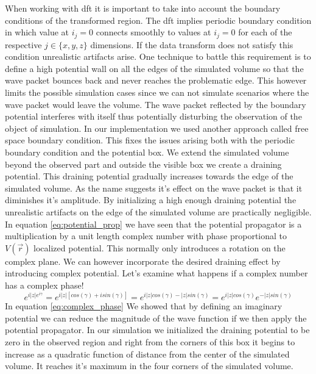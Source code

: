 When working with \acrshort{dft} it is important to take into account the boundary conditions of the transformed region.
The \acrshort{dft} implies periodic boundary condition in which value at $i_j = 0$ connects smoothly to values at $i_j = 0$ for each of the respective $j \in \{x, y, z\}$ dimensions.
If the data transform does not satisfy this condition unrealistic artifacts arise.
One technique to battle this requirement is to define a high potential wall on all the edges of the simulated volume so that the wave packet bounces back and never reaches the problematic edge.
This however limits the possible simulation cases since we can not simulate scenarios where the wave packet would leave the volume.
The wave packet reflected by the boundary potential interferes with itself thus potentially disturbing the observation of the object of simulation.
In our implementation we used another approach called free space boundary condition.
This fixes the issues arising both with the periodic boundary condition and the potential box.
We extend the simulated volume beyond the observed part and outside the visible box we create a draining potential.
This draining potential gradually increases towards the edge of the simulated volume.
As the name suggests it's effect on the wave packet is that it diminishes it's amplitude.
By initializing a high enough draining potential the unrealistic artifacts on the edge of the simulated volume are practically negligible.
In equation \ref{eq:potential_prop} we have seen that the potential propagator is a multiplication by a unit length complex number with phase proportional to $V(\vec{r})$ localized potential.
This normally only introduces a rotation on the complex plane.
We can however incorporate the desired draining effect by introducing complex potential.
Let's examine what happens if a complex number has a complex phase!
\begin{equation}
	\label{eq:complex_phase}
	e^{i |z|e^{i\gamma}} = e^{i|z|\left[cos(\gamma) + isin(\gamma)\right]} = e^{i|z|cos(\gamma) - |z|sin(\gamma)}
	= e^{i|z|cos(\gamma)}e^{-|z|sin(\gamma)}
\end{equation}
In equation \ref{eq:complex_phase} We showed that by defining an imaginary potential we can reduce the magnitude of the wave function if we then apply the potential propagator.
In our simulation we initialized the draining potential to be zero in the observed region and right from the corners of this box it begins to increase as a quadratic function of distance from the center of the simulated volume.
It reaches it's maximum in the four corners of the simulated volume.


